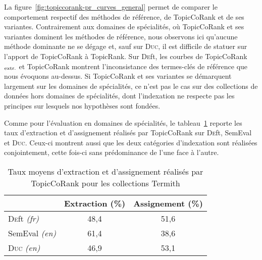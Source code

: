         La figure~\ref{fig:topiccorank-pr_curves_general} permet de comparer le
        comportement respectif des méthodes de référence, de TopicCoRank et de
        ses variantes. Contrairement aux domaines de spécialités, où TopicCoRank
        et ses variantes dominent les méthodes de référence, nous observons ici
        qu'aucune méthode dominante ne se dégage et, sauf sur \textsc{Duc}, il
        est difficile de statuer sur l'apport de TopicCoRank à TopicRank. Sur
        \textsc{De}ft, les courbes de TopicCoRank$_\textnormal{extr.}$ et
        TopicCoRank montrent l'inconsistance des termes-clés de référence que
        nous évoquons au-dessus. Si TopicCoRank et ses variantes se démarquent
        largement sur les domaines de spécialités, ce n'est pas le cas sur des
        collections de données hors domaines de spécialités, dont l'indexation
        ne respecte pas les principes sur lesquels nos hypothèses sont fondées.
        

        Comme pour l'évaluation en domaines de spécialités, le
        tableau~\ref{tab:assignment_ratio_general} reporte les taux d'extraction
        et d'assignement réalisés par TopicCoRank sur \textsc{De}ft, SemEval et
        \textsc{Duc}. Ceux-ci montrent aussi que les deux catégories
        d'indexation sont réalisées conjointement, cette fois-ci sans
        prédominance de l'une face à l'autre.
        \begin{table}[h]
          \centering
          \begin{tabular}{l|c|c}
              \toprule
              & Extraction (\%) & Assignement (\%)\\
              \hline
              \textsc{De}ft \textit{(fr)} & 48,4 & 51,6\\
              SemEval \textit{(en)} & 61,4 & 38,6\\
              \textsc{Duc} \textit{(en)} & 46,9 & 53,1\\
              \bottomrule
          \end{tabular}
          \caption{Taux moyens d'extraction et d'assignement réalisés par
                   TopicCoRank pour les collections Termith
                   \label{tab:assignment_ratio_general}}
        \end{table}

